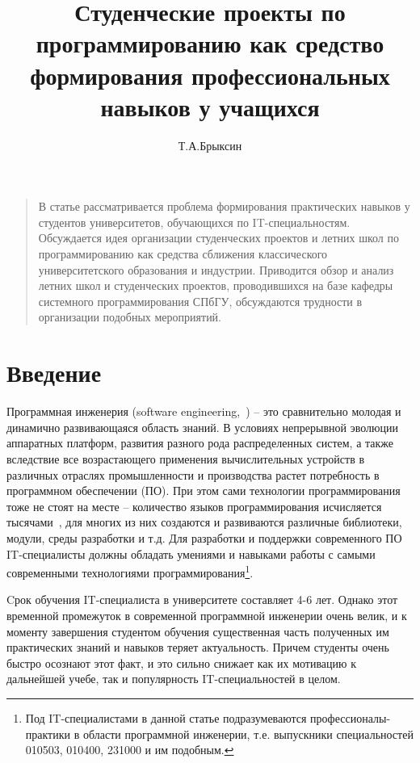 \documentclass[a5paper]{article}
\title{Студенческие проекты по программированию как средство формирования профессиональных навыков у учащихся}
\author{Т.А.Брыксин}
\date{}
\begin{document}
\maketitle
\thispagestyle{empty}

\begin{quote}
\small\noindent
В статье рассматривается проблема формирования практических навыков у студентов университетов, обучающихся по IT-специальностям. Обсуждается идея организации студенческих проектов и летних школ по программированию как средства сближения классического университетского образования и индустрии. Приводится обзор и анализ летних школ и студенческих проектов, проводившихся на базе кафедры системного программирования СПбГУ, обсуждаются трудности в организации подобных мероприятий.
\end{quote}

\section*{Введение} 
Программная инженерия (software engineering,~\cite{swebok}) -- это сравнительно молодая и динамично развивающаяся область знаний. В условиях непрерывной эволюции аппаратных платформ, развития разного рода распределенных систем, а также вследствие все возрастающего применения вычислительных устройств в различных отраслях промышленности и производства растет потребность в программном обеспечении (ПО).  При этом сами технологии программирования тоже не стоят на месте -- количество языков программирования исчисляется тысячами~\cite{langList}, для многих из них создаются и развиваются различные библиотеки, модули, среды разработки и т.д. Для разработки и поддержки современного ПО IT-специалисты должны обладать умениями и навыками работы с самыми современными технологиями программирования\footnote{Под IT-специалистами в данной статье подразумеваются профессионалы-практики в области программной инженерии, т.е. выпускники специальностей 010503, 010400, 231000 и им подобным.}. 
 
Cрок обучения IT-специалиста в университете составляет 4-6 лет. Однако этот временной промежуток  в современной программной инженерии очень велик, и к моменту завершения студентом обучения существенная часть полученных им практических знаний и навыков теряет актуальность. Причем студенты очень быстро осознают этот факт, и это сильно снижает как их мотивацию к дальнейшей учебе, так и популярность IT-специальностей в целом. 
\end{document}
